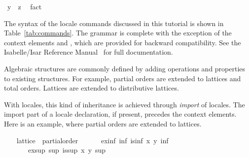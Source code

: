\begin{isabellebody}
\ {}y\ {}\ z{}\ \isamarkupfalse%
\ fact\isanewline
\ \ \ \ \isamarkupfalse%
\isanewline
\ \ \isamarkupfalse%
%
\endisataginvisible
{\isafoldinvisible}%
%
\isadeliminvisible
\isanewline
%
\endisadeliminvisible
\isanewline
\ \ \isamarkupfalse%
%
\begin{isamarkuptext}%
The syntax of the locale commands discussed in this tutorial is
  shown in Table~\ref{tab:commands}.  The grammar is complete with the
  exception of the context elements  and
  , which are provided for backward
  compatibility.  See the Isabelle/Isar Reference
  Manual~\cite{IsarRef} for full documentation.%
\end{isamarkuptext}%
\isamarkuptrue%
%
\isamarkuptrue%
%
\begin{isamarkuptext}%
Algebraic structures are commonly defined by adding operations and
  properties to existing structures.  For example, partial orders
  are extended to lattices and total orders.  Lattices are extended to
  distributive lattices.%
\end{isamarkuptext}%
\isamarkuptrue%
%
\begin{isamarkuptext}%
With locales, this kind of inheritance is achieved through
  \emph{import} of locales.  The import part of a locale declaration,
  if present, precedes the context elements.  Here is an example,
  where partial orders are extended to lattices.%
\end{isamarkuptext}%
\isamarkuptrue%
\ \ \isamarkupfalse%
\ lattice\ {}\ partial{}order\ {}\isanewline
\ \ \ \ \ ex{}inf{}\ {}{}inf{}\ is{}inf\ x\ y\ inf{}\isanewline
\ \ \ \ \ \ \ ex{}sup{}\ {}{}sup{}\ is{}sup\ x\ y\ sup{}\isanewline

\end{isabellebody}
